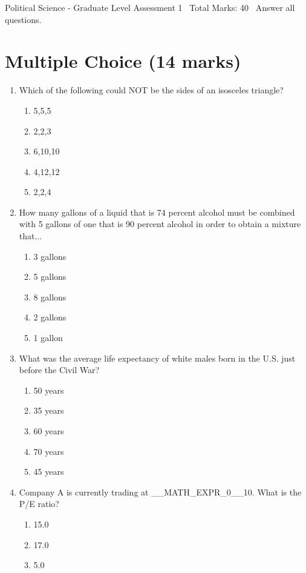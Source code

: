 \documentclass[12pt]{article}
\begin{document}
\begin{center}
Political Science - Graduate Level Assessment 1 \
Total Marks: 40 \
Answer all questions.
\end{center}

\section*{Multiple Choice (14 marks)}
\begin{enumerate}[label=\arabic*.]
\item Which of the following could NOT be the sides of an isosceles triangle?
\begin{enumerate}[label=(\alph*)]
    \item 5,5,5
    \item 2,2,3
    \item 6,10,10
    \item 4,12,12
    \item 2,2,4
\end{enumerate}
\item How many gallons of a liquid that is 74 percent alcohol must be combined with 5 gallons of one that is 90 percent alcohol in order to obtain a mixture that...
\begin{enumerate}[label=(\alph*)]
    \item 3 gallons
    \item 5 gallons
    \item 8 gallons
    \item 2 gallons
    \item 1 gallon
\end{enumerate}
\item What was the average life expectancy of white males born in the U.S. just before the Civil War?
\begin{enumerate}[label=(\alph*)]
    \item 50 years
    \item 35 years
    \item 60 years
    \item 70 years
    \item 45 years
\end{enumerate}
\item Company A is currently trading at \_\_MATH\_EXPR\_0\_\_10. What is the P/E ratio?
\begin{enumerate}[label=(\alph*)]
    \item 15.0
    \item 17.0
    \item 5.0

\end{enumerate}
\end{enumerate}
\end{document}
